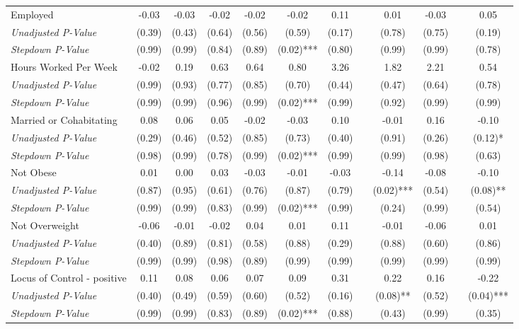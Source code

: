 \begin{tabular}{l c c c c c c c c c c c}
Employed & -0.03 & -0.03 & -0.02 & -0.02 & -0.02 & 0.11 & & 0.01 & -0.03 & & 0.05 \\
\quad \textit{Unadjusted P-Value} & (0.39) & (0.43) & (0.64) & (0.56) & (0.59) & (0.17) & & (0.78) & (0.75) & & (0.19) \\
\quad \textit{Stepdown P-Value} & (0.99) & (0.99) & (0.84) & (0.89) & (0.02)*** & (0.80) & & (0.99) & (0.99) & & (0.78) \\
Hours Worked Per Week & -0.02 & 0.19 & 0.63 & 0.64 & 0.80 & 3.26 & & 1.82 & 2.21 & & 0.54 \\
\quad \textit{Unadjusted P-Value} & (0.99) & (0.93) & (0.77) & (0.85) & (0.70) & (0.44) & & (0.47) & (0.64) & & (0.78) \\
\quad \textit{Stepdown P-Value} & (0.99) & (0.99) & (0.96) & (0.99) & (0.02)*** & (0.99) & & (0.92) & (0.99) & & (0.99) \\
Married or Cohabitating & 0.08 & 0.06 & 0.05 & -0.02 & -0.03 & 0.10 & & -0.01 & 0.16 & & -0.10 \\
\quad \textit{Unadjusted P-Value} & (0.29) & (0.46) & (0.52) & (0.85) & (0.73) & (0.40) & & (0.91) & (0.26) & & (0.12)* \\
\quad \textit{Stepdown P-Value} & (0.98) & (0.99) & (0.78) & (0.99) & (0.02)*** & (0.99) & & (0.99) & (0.98) & & (0.63) \\
Not Obese & 0.01 & 0.00 & 0.03 & -0.03 & -0.01 & -0.03 & & -0.14 & -0.08 & & -0.10 \\
\quad \textit{Unadjusted P-Value} & (0.87) & (0.95) & (0.61) & (0.76) & (0.87) & (0.79) & & (0.02)*** & (0.54) & & (0.08)** \\
\quad \textit{Stepdown P-Value} & (0.99) & (0.99) & (0.83) & (0.99) & (0.02)*** & (0.99) & & (0.24) & (0.99) & & (0.54) \\
Not Overweight & -0.06 & -0.01 & -0.02 & 0.04 & 0.01 & 0.11 & & -0.01 & -0.06 & & 0.01 \\
\quad \textit{Unadjusted P-Value} & (0.40) & (0.89) & (0.81) & (0.58) & (0.88) & (0.29) & & (0.88) & (0.60) & & (0.86) \\
\quad \textit{Stepdown P-Value} & (0.99) & (0.99) & (0.98) & (0.89) & (0.99) & (0.99) & & (0.99) & (0.99) & & (0.99) \\
Locus of Control - positive & 0.11 & 0.08 & 0.06 & 0.07 & 0.09 & 0.31 & & 0.22 & 0.16 & & -0.22 \\
\quad \textit{Unadjusted P-Value} & (0.40) & (0.49) & (0.59) & (0.60) & (0.52) & (0.16) & & (0.08)** & (0.52) & & (0.04)*** \\
\quad \textit{Stepdown P-Value} & (0.99) & (0.99) & (0.83) & (0.89) & (0.02)*** & (0.88) & & (0.43) & (0.99) & & (0.35) \\

\end{tabular}
